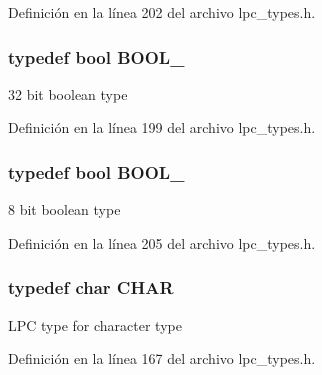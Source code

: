 Definición en la línea 202 del archivo lpc\+\_\+types.\+h.

\subsubsection[{\texorpdfstring{B\+O\+O\+L\+\_\+32}{BOOL_32}}]{\setlength{\rightskip}{0pt plus 5cm}typedef bool {\bf B\+O\+O\+L\+\_}}\hypertarget{group___l_p_c___types___public___types_gab02ba567b91b6b3d3c0c0209b2f577a0}{}\label{group___l_p_c___types___public___types_gab02ba567b91b6b3d3c0c0209b2f577a0}
32 bit boolean type 

Definición en la línea 199 del archivo lpc\+\_\+types.\+h.

\subsubsection[{\texorpdfstring{B\+O\+O\+L\+\_\+8}{BOOL_8}}]{\setlength{\rightskip}{0pt plus 5cm}typedef bool {\bf B\+O\+O\+L\+\_}}\hypertarget{group___l_p_c___types___public___types_ga7cc7a8cc54a0a73fbfcc1eb0b792148d}{}\label{group___l_p_c___types___public___types_ga7cc7a8cc54a0a73fbfcc1eb0b792148d}
8 bit boolean type 

Definición en la línea 205 del archivo lpc\+\_\+types.\+h.

\subsubsection[{\texorpdfstring{C\+H\+AR}{CHAR}}]{\setlength{\rightskip}{0pt plus 5cm}typedef char {\bf C\+H\+AR}}\hypertarget{group___l_p_c___types___public___types_gaebb9e13210d88d43e32e735ada43a425}{}\label{group___l_p_c___types___public___types_gaebb9e13210d88d43e32e735ada43a425}
L\+PC type for character type 

Definición en la línea 167 del archivo lpc\+\_\+types.\+h.

